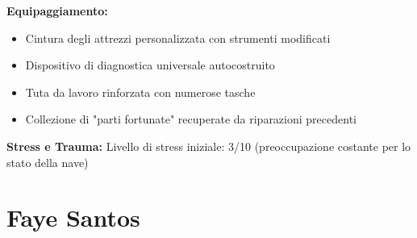 \documentclass[11pt,a4paper]{article}
\begin{document}
\begin{tcolorbox}[colback=mininglightorange!20, colframe=miningorange]
\textbf{Equipaggiamento:}
\begin{itemize}[leftmargin=*]
\item Cintura degli attrezzi personalizzata con strumenti modificati
\item Dispositivo di diagnostica universale autocostruito
\item Tuta da lavoro rinforzata con numerose tasche
\item Collezione di "parti fortunate" recuperate da riparazioni precedenti
\end{itemize}

\textbf{Stress e Trauma:} Livello di stress iniziale: 3/10 (preoccupazione costante per lo stato della nave)
\end{tcolorbox}

\section{Faye Santos}
\end{document}
